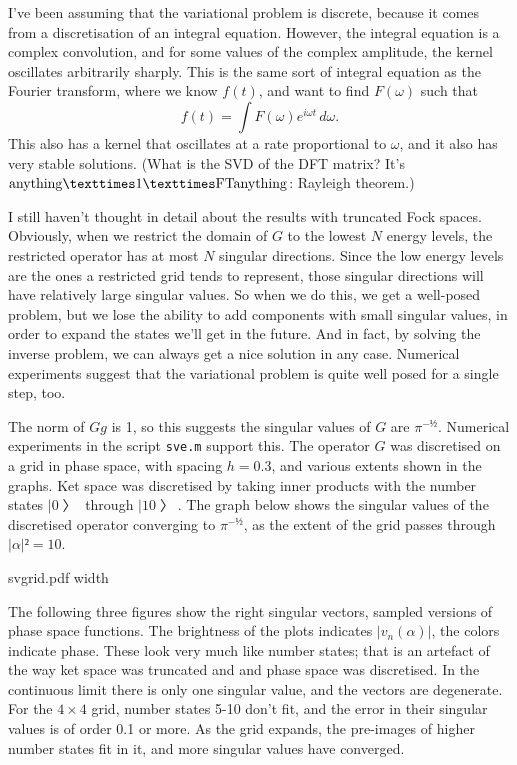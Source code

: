 I've been assuming that the variational problem is discrete, because it comes from a discretisation of an integral equation.  However, the integral equation is a complex convolution, and for some values of the complex amplitude, the kernel oscillates arbitrarily sharply.  This is the same sort of integral equation as the Fourier transform, where we know $f(t)$, and want to find $F(ω)$ such that
$$f(t)=\int F(ω)e^{iωt}\,dω.$$
This also has a kernel that oscillates at a rate proportional to $ω$, and it also has very stable solutions.  (What is the SVD of the DFT matrix?  It's ${\rm anything}×1×{\rm FT anything}$: Rayleigh theorem.)


I still haven't thought in detail about the results with truncated Fock spaces.  Obviously, when we restrict the domain of $G$ to the lowest $N$ energy levels, the restricted operator has at most $N$ singular directions.  Since the low energy levels are the ones a restricted grid tends to represent, those singular directions will have relatively large singular values.  So when we do this, we get a well-posed problem, but we lose the ability to add components with small singular values, in order to expand the states we'll get in the future.  And in fact, by solving the inverse problem, we can always get a nice solution in any case.  Numerical experiments suggest that the variational problem is quite well posed for a single step, too.

The norm of $Gg$ is 1, so this suggests the singular values of $G$ are $π^{-½}$.  Numerical experiments in the script {\tt sve.m} support this.  The operator $G$ was discretised on a grid in phase space, with spacing $h=0.3$, and various extents shown in the graphs.  Ket space was discretised by taking inner products with the number states $|0〉$ through $|10〉$.  The graph below shows the singular values of the discretised operator converging to $π^{-½}$, as the extent of the grid passes through $|α|²=10$.

\centerline{\XeTeXpicfile svgrid.pdf width \hsize}

The following three figures show the right singular vectors, sampled versions of phase space functions.  The brightness of the plots indicates $|v_n(α)|$, the colors indicate phase.  These look very much like number states; that is an artefact of the way ket space was truncated and and phase space was discretised.  In the continuous limit there is only one singular value, and the vectors are degenerate.  For the $4×4$ grid, number states 5-10 don't fit, and the error in their singular values is of order 0.1 or more.  As the grid expands, the pre-images of higher number states fit in it, and more singular values have converged.

